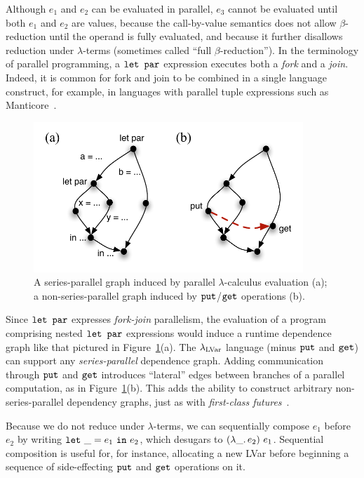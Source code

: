 Although $e_1$ and $e_2$ can be evaluated in parallel, $e_3$ cannot be
evaluated until both $e_1$ and $e_2$ are values, because the
call-by-value semantics does not allow $\beta$-reduction until the
operand is fully evaluated, and because it further disallows reduction
under $\lambda$-terms (sometimes called ``full $\beta$-reduction'').
In the terminology of parallel programming, a $\mbox{\texttt{\mbox{\texttt{let}}~\mbox{\texttt{par}}}}$ expression
executes both a \emph{fork} and a \emph{join}.  Indeed, it is common
for fork and join to be combined in a single language construct, for
example, in languages with parallel tuple expressions such as
Manticore~\cite{manticore_parallel_tuples}.

\begin{figure}[tb]
  \centering 
\includegraphics[width=4in]{chapter2/figures/SeriesParallel.pdf} 
\caption{A series-parallel graph induced by parallel
  $\lambda$-calculus evaluation (a); a non-series-parallel graph
  induced by $\mbox{\texttt{put}}$/$\mbox{\texttt{get}}$ operations (b).}
  \label{f:series-parallel}
\end{figure}

Since $\mbox{\texttt{\mbox{\texttt{let}}~\mbox{\texttt{par}}}}$ expresses \emph{fork-join} parallelism, the evaluation
of a program comprising nested $\mbox{\texttt{\mbox{\texttt{let}}~\mbox{\texttt{par}}}}$ expressions would induce a
runtime dependence graph like that pictured in
Figure~\ref{f:series-parallel}(a).  The $\lambda_{\textrm{LVar}}$ language (minus
$\mbox{\texttt{put}}$ and $\mbox{\texttt{get}}$) can support any \emph{series-parallel} dependence
graph.  Adding communication through $\mbox{\texttt{put}}$ and $\mbox{\texttt{get}}$ introduces
``lateral'' edges between branches of a parallel computation, as in
Figure~\ref{f:series-parallel}(b).  This adds the ability to construct
arbitrary non-series-parallel dependency graphs, just as with
\emph{first-class futures}~\cite{beyond-nested-workstealing}.

Because we do not reduce under $\lambda$-terms, we can sequentially
compose $e_1$ before $e_2$ by writing $\mbox{\texttt{let}}~\_=e_1~\mbox{\texttt{in}}~e_2$, which
desugars to $(\lambda\_.\,e_2)~e_1$.  Sequential composition is
useful for, for instance, allocating a new LVar before beginning a
sequence of side-effecting $\mbox{\texttt{put}}$ and $\mbox{\texttt{get}}$ operations on it.


